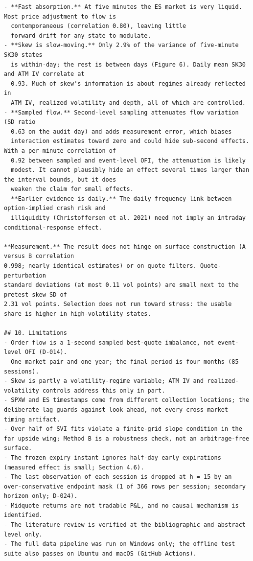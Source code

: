 \documentclass[11pt]{article}
\begin{document}
\begin{verbatim}
- **Fast absorption.** At five minutes the ES market is very liquid. Most price adjustment to flow is
  contemporaneous (correlation 0.80), leaving little
  forward drift for any state to modulate.
- **Skew is slow-moving.** Only 2.9% of the variance of five-minute SK30 states
  is within-day; the rest is between days (Figure 6). Daily mean SK30 and ATM IV correlate at
  0.93. Much of skew's information is about regimes already reflected in
  ATM IV, realized volatility and depth, all of which are controlled.
- **Sampled flow.** Second-level sampling attenuates flow variation (SD ratio
  0.63 on the audit day) and adds measurement error, which biases
  interaction estimates toward zero and could hide sub-second effects. With a per-minute correlation of
  0.92 between sampled and event-level OFI, the attenuation is likely
  modest. It cannot plausibly hide an effect several times larger than the interval bounds, but it does
  weaken the claim for small effects.
- **Earlier evidence is daily.** The daily-frequency link between option-implied crash risk and
  illiquidity (Christoffersen et al. 2021) need not imply an intraday conditional-response effect.

**Measurement.** The result does not hinge on surface construction (A versus B correlation
0.998; nearly identical estimates) or on quote filters. Quote-perturbation
standard deviations (at most 0.11 vol points) are small next to the pretest skew SD of
2.31 vol points. Selection does not run toward stress: the usable share is higher in high-volatility states.

## 10. Limitations
- Order flow is a 1-second sampled best-quote imbalance, not event-level OFI (D-014).
- One market pair and one year; the final period is four months (85 sessions).
- Skew is partly a volatility-regime variable; ATM IV and realized-volatility controls address this only in part.
- SPXW and ES timestamps come from different collection locations; the deliberate lag guards against look-ahead, not every cross-market timing artifact.
- Over half of SVI fits violate a finite-grid slope condition in the far upside wing; Method B is a robustness check, not an arbitrage-free surface.
- The frozen expiry instant ignores half-day early expirations (measured effect is small; Section 4.6).
- The last observation of each session is dropped at h = 15 by an over-conservative endpoint mask (1 of 366 rows per session; secondary horizon only; D-024).
- Midquote returns are not tradable P&L, and no causal mechanism is identified.
- The literature review is verified at the bibliographic and abstract level only.
- The full data pipeline was run on Windows only; the offline test suite also passes on Ubuntu and macOS (GitHub Actions).


\end{verbatim}
\end{document}
